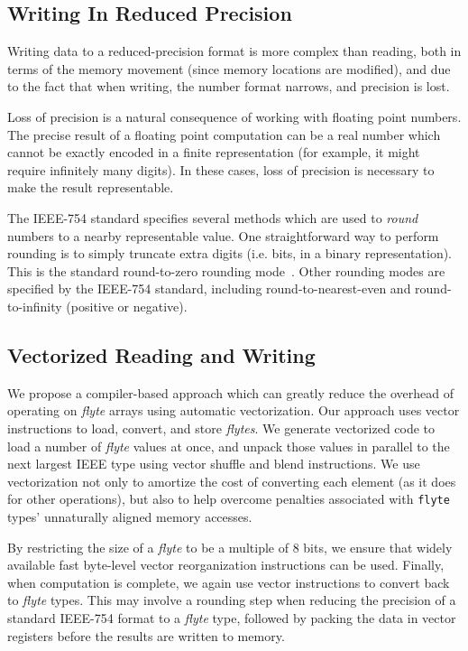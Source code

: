 \documentclass{sig-alternate-05-2015}
\begin{document}
\subsection{Writing In Reduced Precision}
\label{sec:writes}

Writing data to a reduced-precision format is more complex than reading, both
in terms of the memory movement (since memory locations are modified), and due
to the fact that when writing, the number format narrows, and precision is
lost.

Loss of precision is a natural consequence of working with floating point
numbers. The precise result of a floating point computation can be a real
number which cannot be exactly encoded in a finite representation (for example,
it might require infinitely many digits). In these cases, loss of precision is
necessary to make the result representable.

The IEEE-754 standard specifies
several methods which are used to \emph{round} numbers to a nearby
representable value. One straightforward way to perform rounding is to simply
truncate extra digits (i.e. bits, in a binary representation). This is the
standard round-to-zero rounding mode~\cite{zuras2008ieee}. Other rounding modes
are specified by the IEEE-754 standard, including round-to-nearest-even and
round-to-infinity (positive or negative).





\subsection{Vectorized Reading and Writing}
\label{sec:vector-approach}

We propose a compiler-based approach which can greatly reduce the overhead of
operating on \textit{flyte} arrays using automatic vectorization. Our approach
uses vector instructions to load, convert, and store \textit{flytes}. We
generate vectorized code to load a number of \textit{flyte} values at once, and
unpack those values in parallel to the next largest IEEE type using vector
shuffle and blend instructions. We use vectorization not only to amortize the
cost of converting each element (as it does for other operations), but also to
help overcome penalties associated with \texttt{flyte} types' unnaturally
aligned memory accesses.

By restricting the size of a \textit{flyte} to be a multiple of 8 bits, we
ensure that widely available fast byte-level vector reorganization instructions
can be used. Finally, when computation is complete, we again use vector
instructions to convert back to \textit{flyte} types. This may involve a
rounding step when reducing the precision of a standard IEEE-754 format to a
\textit{flyte} type, followed by packing the data in vector registers before
the results are written to memory.
\end{document}
